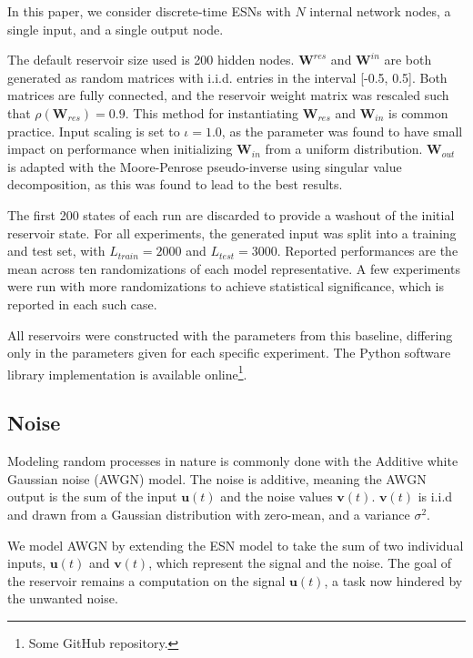 In this paper, we consider discrete-time ESNs with $N$ internal network nodes, a
single input, and a single output node.

The default reservoir size used is 200 hidden nodes. $\mathbf{W}^{res}$ and
$\mathbf{W}^{in}$ are both generated as random matrices with i.i.d. entries in
the interval [-0.5, 0.5]. Both matrices are fully connected, and the reservoir
weight matrix was rescaled such that $\rho(\mathbf{W}_{res}) = 0.9$. This method
for instantiating $\mathbf{W}_{res}$ and $\mathbf{W}_{in}$ is common
practice. Input scaling is set to $\iota = 1.0$, as the parameter was found to
have small impact on performance when initializing $\mathbf{W}_{in}$ from a
uniform distribution. $\mathbf{W}_{out}$ is adapted with the Moore-Penrose
pseudo-inverse using singular value decomposition, as this was found to lead to
the best results.

The first 200 states of each run are discarded to provide a washout of the
initial reservoir state. For all experiments, the generated input was split into
a training and test set, with $L_{train} = 2000$ and $L_{test} = 3000$. Reported
performances are the mean across ten randomizations of each model
representative. A few experiments were run with more randomizations to achieve
statistical significance, which is reported in each such case.

All reservoirs were constructed with the parameters from this baseline,
differing only in the parameters given for each specific experiment. The Python
software library implementation is available online\footnote{Some GitHub
repository.}.


\subsection{Noise}

Modeling random processes in nature is commonly done with the Additive white
Gaussian noise (AWGN) model. The noise is additive, meaning the AWGN output is
the sum of the input $\mathbf{u}(t)$ and the noise values
$\mathbf{v}(t)$. $\mathbf{v}(t)$ is i.i.d and drawn from a Gaussian distribution
with zero-mean, and a variance $\sigma^{2}$.

We model AWGN by extending the ESN model to take the sum of two individual
inputs, $\mathbf{u}(t)$ and $\mathbf{v}(t)$, which represent the signal and the
noise. The goal of the reservoir remains a computation on the signal
$\mathbf{u}(t)$, a task now hindered by the unwanted noise.


